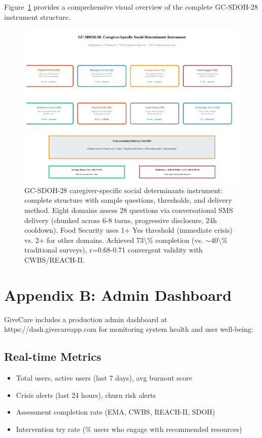 \documentclass{article}%
\begin{document}
Figure~\ref{fig:gcsdoh_visual} provides a comprehensive visual overview of the complete GC-SDOH-28 instrument structure.

%
\begin{figure}[htbp]%
\centering%
\includegraphics[width=\textwidth]{fig14_gcsdoh_instrument.pdf}%
\caption{GC-SDOH-28 caregiver-specific social determinants instrument: complete structure with sample questions, thresholds, and delivery method. Eight domains assess 28 questions via conversational SMS delivery (chunked across 6-8 turns, progressive disclosure, 24h cooldown). Food Security uses 1+ Yes threshold (immediate crisis) vs. 2+ for other domains. Achieved 73\textbackslash{}\% completion (vs. $\sim$40\textbackslash{}\% traditional surveys), r=0.68-0.71 convergent validity with CWBS/REACH-II.}%
\label{fig:gcsdoh_visual}%
\end{figure}%
\section*{Appendix B: Admin Dashboard}

GiveCare includes a production admin dashboard at https://dash.givecareapp.com for monitoring system health and user well-being:

\subsection*{Real-time Metrics}
\begin{itemize}
    \item Total users, active users (last 7 days), avg burnout score
    \item Crisis alerts (last 24 hours), churn risk alerts
    \item Assessment completion rate (EMA, CWBS, REACH-II, SDOH)
    \item Intervention try rate (\% users who engage with recommended resources)
\end{itemize}
\end{document}
